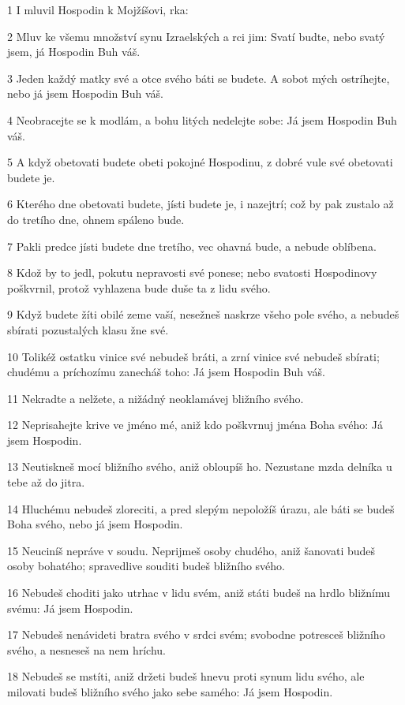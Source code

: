 \par 1 I mluvil Hospodin k Mojžíšovi, rka:
\par 2 Mluv ke všemu množství synu Izraelských a rci jim: Svatí budte, nebo svatý jsem, já Hospodin Buh váš.
\par 3 Jeden každý matky své a otce svého báti se budete. A sobot mých ostríhejte, nebo já jsem Hospodin Buh váš.
\par 4 Neobracejte se k modlám, a bohu litých nedelejte sobe: Já jsem Hospodin Buh váš.
\par 5 A když obetovati budete obeti pokojné Hospodinu, z dobré vule své obetovati budete je.
\par 6 Kterého dne obetovati budete, jísti budete je, i nazejtrí; což by pak zustalo až do tretího dne, ohnem spáleno bude.
\par 7 Pakli predce jísti budete dne tretího, vec ohavná bude, a nebude oblíbena.
\par 8 Kdož by to jedl, pokutu nepravosti své ponese; nebo svatosti Hospodinovy poškvrnil, protož vyhlazena bude duše ta z lidu svého.
\par 9 Když budete žíti obilé zeme vaší, nesežneš naskrze všeho pole svého, a nebudeš sbírati pozustalých klasu žne své.
\par 10 Tolikéž ostatku vinice své nebudeš bráti, a zrní vinice své nebudeš sbírati; chudému a príchozímu zanecháš toho: Já jsem Hospodin Buh váš.
\par 11 Nekradte a nelžete, a nižádný neoklamávej bližního svého.
\par 12 Neprisahejte krive ve jméno mé, aniž kdo poškvrnuj jména Boha svého: Já jsem Hospodin.
\par 13 Neutiskneš mocí bližního svého, aniž obloupíš ho. Nezustane mzda delníka u tebe až do jitra.
\par 14 Hluchému nebudeš zloreciti, a pred slepým nepoložíš úrazu, ale báti se budeš Boha svého, nebo já jsem Hospodin.
\par 15 Neuciníš nepráve v soudu. Neprijmeš osoby chudého, aniž šanovati budeš osoby bohatého; spravedlive souditi budeš bližního svého.
\par 16 Nebudeš choditi jako utrhac v lidu svém, aniž státi budeš na hrdlo bližnímu svému: Já jsem Hospodin.
\par 17 Nebudeš nenávideti bratra svého v srdci svém; svobodne potresceš bližního svého, a nesneseš na nem hríchu.
\par 18 Nebudeš se mstíti, aniž držeti budeš hnevu proti synum lidu svého, ale milovati budeš bližního svého jako sebe samého: Já jsem Hospodin.
